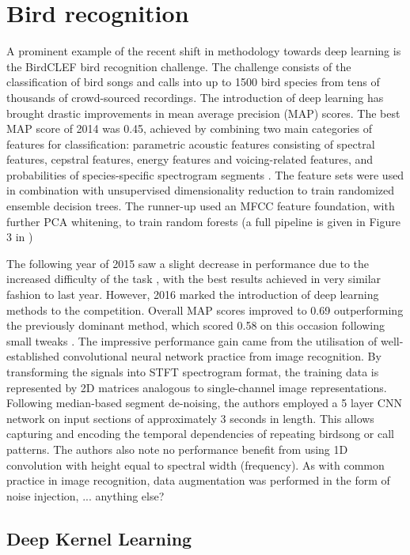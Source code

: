 \documentclass[12pt]{llncs}
\begin{document}
\section{Bird recognition}
\label{sec:birdrecognition}
A prominent example of the recent shift in methodology towards deep learning is the BirdCLEF bird recognition challenge. The challenge consists of the classification of bird songs and calls into up to 1500 bird species from tens of thousands of crowd-sourced recordings. The introduction of deep learning has brought drastic improvements in mean average precision (MAP) scores. The best MAP score of 2014 was 0.45, achieved by combining two main categories of features for classification: parametric acoustic features consisting of spectral features, cepstral features, energy features and voicing-related features, and probabilities of species-specific spectrogram segments \cite{goeau2014lifeclef}. The feature sets were used in combination with unsupervised dimensionality reduction to train randomized ensemble decision trees. The runner-up used an MFCC feature foundation, with further PCA whitening, to train random forests (a full pipeline is given in Figure 3 in \cite{stowell2014automatic})

The following year of 2015 saw a slight decrease in performance due to the increased difficulty of the task \cite{goeau2015lifeclef}, with the best results achieved in very similar fashion to last year. However, 2016 marked the introduction of deep learning methods to the competition. Overall MAP scores improved to 0.69 outperforming the previously dominant method, which scored 0.58  on this occasion following small tweaks \cite{joly2016lifeclef}. The impressive performance gain came from the utilisation of well-established convolutional neural network practice from image recognition. By transforming the signals into STFT spectrogram format, the training data is represented by 2D matrices analogous to single-channel image representations. Following median-based segment de-noising, the authors employed a 5 layer CNN network on input sections of approximately 3 seconds in length. This allows capturing and encoding the temporal dependencies of repeating birdsong or call patterns. The authors also note no performance benefit from using 1D convolution with height equal to spectral width (frequency). As with common practice in image recognition, data augmentation was performed in the form of noise injection, ... anything else?

\subsection{Deep Kernel Learning}
\end{document}
